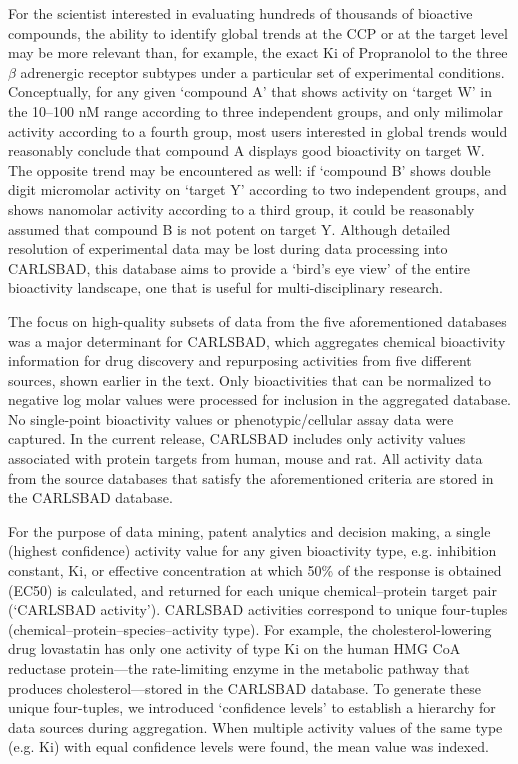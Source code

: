For the scientist interested in evaluating hundreds of thousands of bioactive compounds, the ability to identify global trends at the CCP or at the target level may be more relevant than, for example, the exact Ki of Propranolol to the three $\beta$ adrenergic receptor subtypes under a particular set of experimental conditions. Conceptually, for any given ‘compound A’ that shows activity on ‘target W’ in the 10–100 nM range according to three independent groups, and only milimolar activity according to a fourth group, most users interested in global trends would reasonably conclude that compound A displays good bioactivity on target W. The opposite trend may be encountered as well: if ‘compound B’ shows double digit micromolar activity on ‘target Y’ according to two independent groups, and shows nanomolar activity according to a third group, it could be reasonably assumed that compound B is not potent on target Y. Although detailed resolution of experimental data may be lost during data processing into CARLSBAD, this database aims to provide a ‘bird’s eye view’ of the entire bioactivity landscape, one that is useful for multi-disciplinary research.

The focus on high-quality subsets of data from the five aforementioned databases was a major determinant for CARLSBAD, which aggregates chemical bioactivity information for drug discovery and repurposing activities from five different sources, shown earlier in the text. Only bioactivities that can be normalized to negative log molar values were processed for inclusion in the aggregated database. No single-point bioactivity values or phenotypic/cellular assay data were captured. In the current release, CARLSBAD includes only activity values associated with protein targets from human, mouse and rat. All activity data from the source databases that satisfy the aforementioned criteria are stored in the CARLSBAD database.

For the purpose of data mining, patent analytics and decision making, a single (highest confidence) activity value for any given bioactivity type, e.g. inhibition constant, Ki, or effective concentration at which 50\% of the response is obtained (EC50) is calculated, and returned for each unique chemical–protein target pair (‘CARLSBAD activity’). CARLSBAD activities correspond to unique four-tuples (chemical–protein–species–activity type). For example, the cholesterol-lowering drug lovastatin has only one activity of type Ki on the human HMG CoA reductase protein—the rate-limiting enzyme in the metabolic pathway that produces cholesterol—stored in the CARLSBAD database. To generate these unique four-tuples, we introduced ‘confidence levels’ to establish a hierarchy for data sources during aggregation. When multiple activity values of the same type (e.g. Ki) with equal confidence levels were found, the mean value was indexed.

